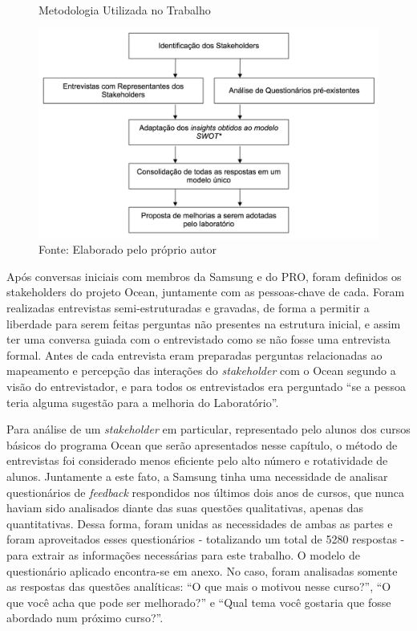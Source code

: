 \label{chap:metodologia}

\begin{figure}[h]
\caption{Metodologia Utilizada no Trabalho}
\centerline{\includegraphics[scale=0.5]{img/metodologia}}
\label{fig:metodologia}
\caption* {Fonte: Elaborado pelo próprio autor}
\end{figure}

Após conversas iniciais com membros da Samsung e do PRO, foram definidos os stakeholders do projeto Ocean, juntamente com as pessoas-chave de cada. Foram realizadas entrevistas semi-estruturadas e gravadas, de forma a permitir a liberdade para serem feitas perguntas não presentes na estrutura inicial, e assim ter uma conversa guiada com o entrevistado como se não fosse uma entrevista formal. Antes de cada entrevista eram preparadas perguntas relacionadas ao mapeamento e percepção das interações do \textit{stakeholder} com o Ocean segundo a visão do entrevistador, e para todos os entrevistados era perguntado \enquote{se a pessoa teria alguma sugestão para a melhoria do Laboratório}.

Para análise de um \textit{stakeholder} em particular, representado pelo alunos dos cursos básicos do programa Ocean que serão apresentados nesse capítulo, o método de entrevistas foi considerado menos eficiente pelo alto número e rotatividade de alunos. Juntamente a este fato, a Samsung tinha uma necessidade de analisar questionários de \textit{feedback} respondidos nos últimos dois anos de cursos, que nunca haviam sido analisados diante das suas questões qualitativas, apenas das quantitativas. Dessa forma, foram unidas as necessidades de ambas as partes e foram aproveitados esses questionários - totalizando um total de 5280 respostas - para extrair as informações necessárias para este trabalho. O modelo de questionário aplicado encontra-se em anexo. No caso, foram analisadas somente as respostas das questões analíticas: \enquote{O que mais o motivou nesse curso?}, \enquote{O que você acha que pode ser melhorado?} e \enquote{Qual tema você gostaria que fosse abordado num próximo curso?}.

